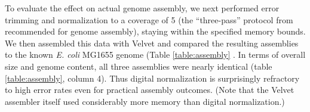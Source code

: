 \documentclass{article}
\begin{document}
To evaluate the effect on actual genome assembly, we next performed
error trimming and normalization to a coverage of 5 (the
``three-pass'' protocol from \cite{Brown2012} recommended for
genome assembly), staying within the specified memory bounds.  We then
assembled this data with Velvet \cite{Zerbino2008} and compared the resulting assemblies to the known
{\em E. coli} MG1655 genome (Table \ref{table:assembly} .  In terms of overall size
and genome content, all three assemblies were nearly identical (table
\ref{table:assembly}, column 4).  Thus digital normalization is surprisingly refractory to high
error rates even for practical assembly outcomes.  (Note that
the Velvet assembler itself used considerably more memory than digital
normalization.)

\begin{table}[ht]
\caption{Low-memory digital normalization. The results of digitally
  normalizing a 5m read {\em E. coli} data set to C=20 with k=20 under
  several memory usage/error rates.  The error rate
  (column 1) is empirically determined.  We measured reads remaining,
  number of ``true'' k-mers that were removed during the normalization
  process, and the number of total k-mers remaining.  Note: at high
  error rates, reads are erroneously removed due to inflation
  of k-mer counts.}

\label{table:loop_norm}

\end{table}
\end{document}
